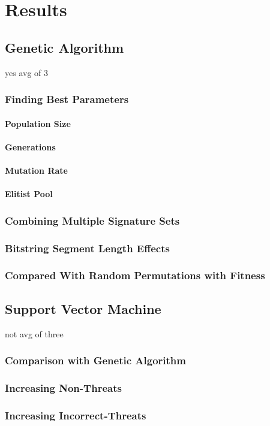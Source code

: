 \chapter{Results}

\section{Genetic Algorithm}

yes avg of 3

\subsection{Finding Best Parameters}

\subsubsection{Population Size}

\subsubsection{Generations}

\subsubsection{Mutation Rate}

\subsubsection{Elitist Pool}

\subsection{Combining Multiple Signature Sets}

\subsection{Bitstring Segment Length Effects}

\subsection{Compared With Random Permutations with Fitness}





\section{Support Vector Machine}

not avg of three

\subsection{Comparison with Genetic Algorithm}

\subsection{Increasing Non-Threats}

\subsection{Increasing Incorrect-Threats}



